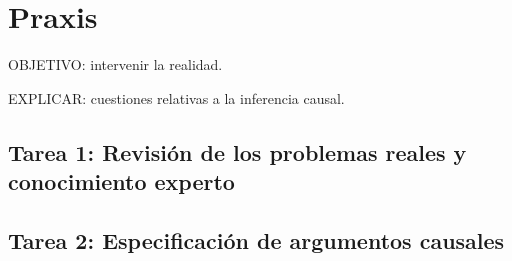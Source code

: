 \documentclass[a4paper,11pt]{book}
\theoremstyle{definition}
\begin{document}
%


\section{Praxis}

OBJETIVO: intervenir la realidad.

EXPLICAR: cuestiones relativas a la inferencia causal.

\subsection{Tarea 1: Revisi\'on de los problemas reales y conocimiento experto}

\subsection{Tarea 2: Especificaci\'on de argumentos causales}
%
%
\end{document}

